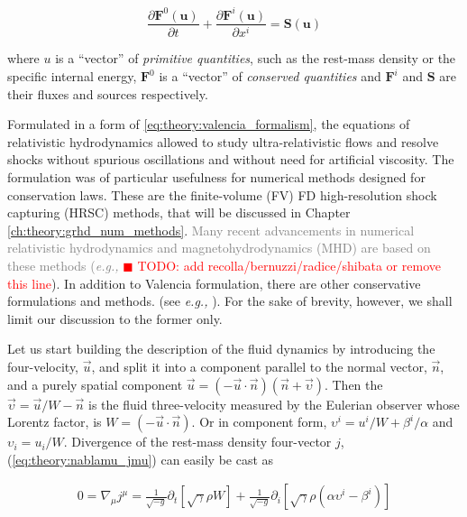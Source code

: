 \documentclass[11pt,a4paper,headinclude=true,DIV=14,BCOR=8mm,chapterprefix,listof=totoc,twoside,openright,abstracton]{scrbook}
\newcommand{\todo}[1]{\textcolor{red}{$\blacksquare$ TODO: #1}}
\newcommand{\gray}[1]{\textcolor{gray}{#1}}
\begin{document}
\begin{equation}
    \frac{\partial\boldsymbol{F}^{0}(\boldsymbol{u})}{\partial t} + \frac{\partial\boldsymbol{F}^{i}(\boldsymbol{u})}{\partial x^{i}} = \boldsymbol{S}(\boldsymbol{u})
    \label{eq:theory:valencia_formalism}
\end{equation}

where $u$ is a “vector” of \textit{primitive quantities}, such as the rest-mass density or the specific internal energy, $\boldsymbol{F}^0$ is a “vector” of \textit{conserved quantities} and $\boldsymbol{F}^i$ and $\boldsymbol{S}$ are their fluxes and sources respectively.

Formulated in a form of \ref{eq:theory:valencia_formalism}, the equations of relativistic hydrodynamics allowed to study ultra-relativistic flows and resolve shocks without spurious oscillations and without need for artificial viscosity. The formulation was of particular usefulness for numerical methods designed for conservation laws. These are the finite-volume (FV) FD high-resolution shock capturing (HRSC) methods, that will be discussed in Chapter \ref{ch:theory:grhd_num_methods}. \gray{Many recent advancements in numerical relativistic hydrodynamics and magnetohydrodynamics (MHD) are based on these methods (\textit{e.g.,} \cite{Giacomazzo:2010bx}} \todo{add recolla/bernuzzi/radice/shibata or remove this line}). In addition to Valencia formulation, there are other conservative formulations and methods.  (see \textit{e.g.,} \cite{Papadopoulos:1999kt}). For the sake of brevity, however, we shall limit our discussion to the former only. 

Let us start building the description of the fluid dynamics by introducing the four-velocity, $\vec{u}$, and split it into a component parallel to the normal vector, $\vec{n}$, and a purely spatial component $\vec{u} = (-\vec{u} \cdot \vec{n})(\vec{n} + \vec{\upsilon})$. Then the $\vec{\upsilon} = \vec{u}/W -\vec{n}$ is the fluid three-velocity measured by the Eulerian observer whose Lorentz factor, is $W = (-\vec{u}\cdot\vec{n})$. Or in component form, $\upsilon^i = u^i/W + \beta^i/\alpha$ and $\upsilon_i = u_{i}/W$. 
Divergence of the rest-mass density four-vector $j$, (\ref{eq:theory:nablamu_jmu}) can easily be cast as 

\begin{eqnarray}
0 = \nabla_{\mu}j^{\mu} = \frac{1}{\sqrt{-g}}\partial_{t}[\sqrt{\gamma}\rho W] + \frac{1}{\sqrt{-g}}\partial_{i}[\sqrt{\gamma}\rho(\alpha \upsilon^{i} - \beta^{i})]
\end{eqnarray}
\end{document}
